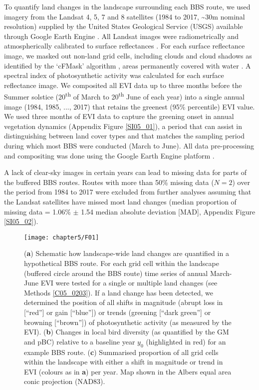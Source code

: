 To quantify land changes in the landscape surrounding each BBS route, we used imagery from the Landsat 4, 5, 7 and 8 satellites (1984 to 2017, \textasciitilde 30m nominal resolution) supplied by the United States Geological Service (USGS) available through Google Earth Engine \citep{Gorelick2017}. All Landsat images were radiometrically \citep{Chander2009} and atmospherically calibrated to surface reflectances \citep{Masek2006}. For each surface reflectance image, we masked out non-land grid cells, including clouds and cloud shadows as identified by the ‘cFMask’ algorithm \citep{Zhu2012}, areas permanently covered with water \citep[> 90\% water occurrence probability in the period 1984 – 2016, ][]{Pekel2016}. A spectral index of photosynthetic activity \citep[the two-band enhanced vegetation index (EVI),][]{Jiang2008} was calculated for each surface reflectance image. We composited all EVI data up to three months before the Summer solstice (20\textsuperscript{th} of March to 20\textsuperscript{th} June of each year) into a single annual image (1984, 1985, ..., 2017) that retains the greenest (95\% percentile) EVI value. We used three months of EVI data to capture the greening onset in annual vegetation dynamics (Appendix Figure \ref{SI05_01}), a period that can assist in distinguishing between land cover types \citep{Pettorelli2005,Fisher2006,Zhang2006} and that matches the sampling period during which most BBS were conducted (March to June). All data pre-processing and compositing was done using the Google Earth Engine platform \citep{Gorelick2017}.

A lack of clear-sky images in certain years can lead to missing data for parts of the buffered BBS routes. Routes with more than 50\% missing data ($N = 2$) over the period from 1984 to 2017 were excluded from further analyses assuming that the Landsat satellites have missed most land changes (median proportion of missing data = 1.06\% $\pm$ 1.54 median absolute deviation [MAD], Appendix Figure \ref{SI05_02}).

\begin{figure}[htb]
\centering
\texttt{[image: chapter5/F01]}
\caption{ (\textbf{a}) Schematic how landscape-wide land changes are quantified in a hypothetical BBS route. For each grid cell within the landscape (buffered circle around the BBS route) time series of annual March-June EVI were tested for a single or multiple land changes (see Methods \ref{C05_0203}). If a land change has been detected, we determined the position of all shifts in magnitude (abrupt loss in [“red”] or gain [“blue”]) or trends (greening [“dark green”] or browning [“brown”]) of photosynthetic activity (as measured by the EVI). (\textbf{b}) Changes in local bird diversity (as quantified by the GM and pBC) relative to a baseline year $y_0$ (highlighted in red) for an example BBS route. (\textbf{c}) Summarised proportion of all grid cells within the landscape with either a shift in magnitude or trend in EVI (colours as in \textbf{a}) per year. Map shown in the Albers equal area conic projection (NAD83).}
\label{F05_01}
\end{figure}

